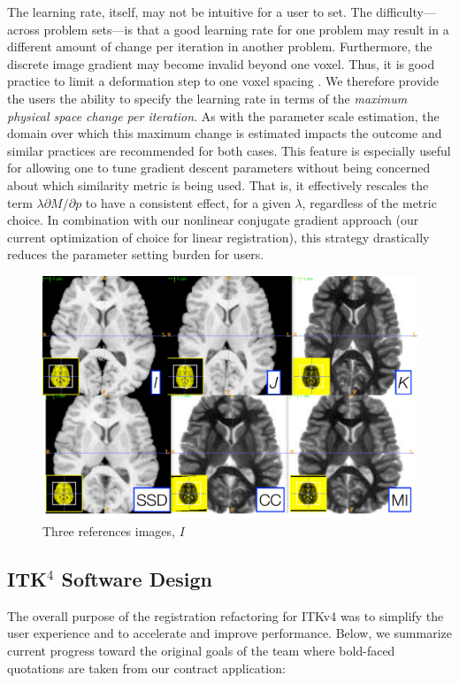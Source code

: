\documentclass{frontiersSCNS}
\begin{document}
The learning rate, itself, may not be intuitive for a user to set.
The difficulty---across problem sets---is that a good learning rate for
one problem may result in a different amount of change per iteration
in another problem.  Furthermore, the discrete image gradient may
become invalid beyond one voxel.  Thus, it is good practice to limit a deformation step to one voxel spacing
\cite{Jenkinson2001}.  We therefore provide the users the ability to
specify the learning rate in terms of the {\em maximum physical space change
  per iteration}.  As with the parameter scale estimation, the domain
over which this maximum change is estimated impacts the outcome and
similar practices are recommended for both cases.   This feature is
especially useful for allowing one to tune gradient descent parameters
without being concerned about which similarity metric is being used.
That is, it effectively rescales the term $\lambda \partial M / \partial p$ to
have a consistent effect, for a given $\lambda$, regardless of the
metric choice.  In combination with our nonlinear conjugate gradient
approach (our current optimization of choice for linear registration),
this strategy drastically reduces the parameter setting burden for
users. 

\begin{figure}[t]
\begin{center}
\includegraphics[width=4.5in]{figs/three.pdf}
\caption{\baselineskip 12pt \small Three references images, $I$}
\end{center}
\end{figure}

\subsection{ITK$^4$ Software Design}
The overall purpose of the registration refactoring for ITKv4 was to simplify the user experience and to accelerate and improve performance. Below, we summarize current progress toward the original goals of the team where bold-faced quotations are taken from our contract application:
\end{document}
